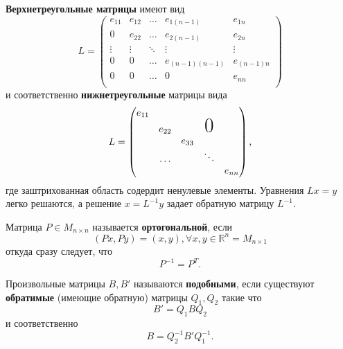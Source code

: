 \textbf{Верхнетреугольные матрицы} имеют вид
\begin{equation} 
	L = \begin{pmatrix}
		e_{11} & e_{12} & \dots &e_{1(n-1)}&e_{1n} \\
		0 & e_{22} & \dots &e_{2(n-1)}&e_{2n} \\
		\vdots & \vdots & \ddots &\vdots &  \vdots\\
		0 & 0 & \dots & e_{(n-1)(n-1)} &e_{(n-1)n} \\
		0 & 0 & \dots & 0 &e_{nn} \\
	\end{pmatrix}
\end{equation}
и соответственно \textbf{нижнетреугольные} матрицы вида 
\begin{equation} 
	L = \begin{pmatrix}
		e_{11}	&		&		&	&        \\
		&e_{22}	&   		& \text{\huge0} &\\
		&		&e_{33} &	&            \\
		&\dots & & \ddots &          \\
		& 		&   		&   & e_{nn} 
	\end{pmatrix},
\end{equation}
где заштрихованная область содердит ненулевые элементы. Уравнения $Lx = y$ легко решаются, а решение $x = L^{-1}y$ задает обратную матрицу $L^{-1}$.


Матрица $P \in M_{n \times n}$ называется \textbf{ортогональной}, если
\begin{equation} \label{eq:6.11}
	(Px, Py) = (x, y), \forall x, y \in \mathbb{R}^n = M_{n \times 1}
\end{equation}
откуда сразу следует, что
\begin{equation} \label{eq:6.12}
	P^{-1} = P^T .
\end{equation}

Произвольные матрицы $B, B'$ называются \textbf{подобными}, если существуют \textbf{обратимые} (имеющие обратную) матрицы $Q_1, Q_2$ такие что
\begin{equation}
	B' = Q_1BQ_2
\end{equation}
и соответственно
\begin{equation}
	B = Q_2^{-1}B'Q_1^{-1}.
\end{equation}

